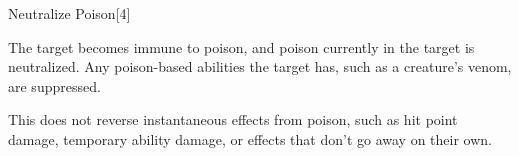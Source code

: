 \begin{spellsection}{Neutralize Poison}[4]
    \begin{spellheader}
    \end{spellheader}
    \begin{spellcontent}
        \begin{spelltargetinginfo}
        \end{spelltargetinginfo}
        \begin{spelleffects}

            \spelleffect The target becomes immune to poison, and poison currently in the target is neutralized. Any poison-based abilities the target has, such as a creature's venom, are suppressed.
            \spelldur \durext \dismissable
        \end{spelleffects}
    \end{spellcontent}
    \begin{spellfooter}
        \spellnotes This does not reverse instantaneous effects from poison, such as hit point damage, temporary ability damage, or effects that don't go away on their own.
    \end{spellfooter}
\end{spellsection}

